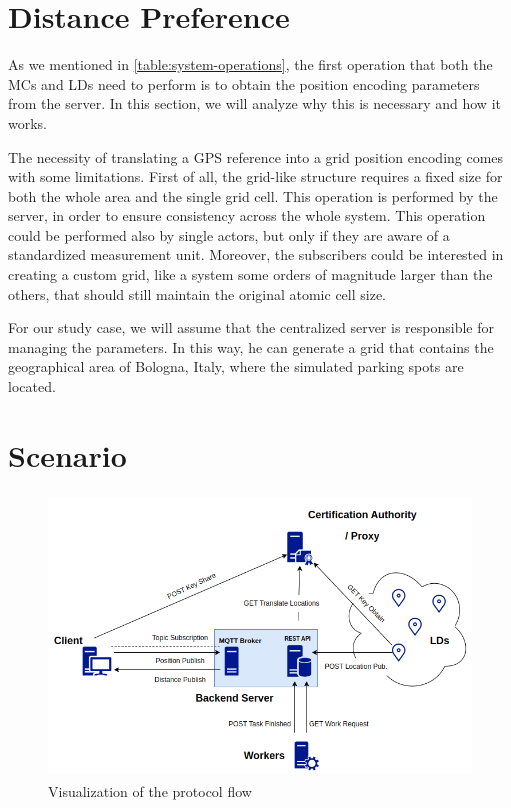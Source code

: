 \section{Distance Preference}

As we mentioned in \cref{table:system-operations}, the first operation that both the MCs and LDs need to perform is to obtain the position encoding parameters from the server. In this section, we will analyze why this is necessary and how it works.

The necessity of translating a GPS reference into a grid position encoding comes with some limitations. First of all, the grid-like structure requires a fixed size for both the whole area and the single grid cell. This operation is performed by the server, in order to ensure consistency across the whole system. This operation could be performed also by single actors, but only if they are aware of a standardized measurement unit. Moreover, the subscribers could be interested in creating a custom grid, like a system some orders of magnitude larger than the others, that should still maintain the original atomic cell size.

For our study case, we will assume that the centralized server is responsible for managing the parameters. In this way, he can generate a grid that contains the geographical area of Bologna, Italy, where the simulated parking spots are located.

\section{Scenario}


\begin{figure}[h]
    \centering
    \includegraphics[width=12cm,height=7.5cm]{img/workflow.png}
    \caption{Visualization of the protocol flow}
    \label{fig:protocol-flow}
\end{figure}

